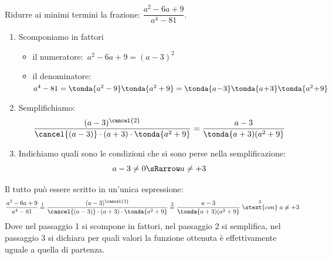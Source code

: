 \begin{esempio}{}{}
Ridurre ai minimi termini la frazione:\quad 
\(\dfrac{a^{2}-6a+9}{a^{4}-81}\).
\begin{enumerate} [left=0mm]
\item Scomponiamo in fattori
\begin{itemize}[left=0mm, nosep]
\item il numeratore:~\(a^2 - 6a +9 = (a - 3 )^2\)
\item il denominatore:
\(a^4 - 81 = \tonda{a^2 - 9} \tonda{a^2 + 9} = 
             \tonda{a\!-\!3}\tonda{a\!+\!3} \tonda{a^2\!+\!9} \)
\end{itemize}
\item Semplifichiamo:
\[\dfrac{(a-3)^{\cancel{2}}}
        {\cancel{(a-3)}\cdot (a+3)\cdot  \tonda{a^{2}+9} }=
  \dfrac{a-3}{\tonda{a+3)(a^{2}+9}}\]
\item Indichiamo quali sono le condizioni che si sono perse nella 
semplificazione:
\[a-3 \neq 0 \sRarrow a \neq +3\]
\end{enumerate}
Il tutto può essere scritto in un'unica espressione:
\[\dfrac{a^{2}-6a+9}{a^{4}-81} \stackrel{1}{=} 
  \dfrac{(a-3)^{\cancel{2}}}
        {\cancel{(a-3)}\cdot (a+3)\cdot \tonda{a^{2}+9}}\stackrel{2}{=} 
  \dfrac{a-3}{ \tonda{a+3)(a^{2}+9}} \stackrel{3}{\stext{con}} 
  a \neq +3\]
Dove nel passaggio 1 si scompone in fattori, nel passaggio 2 si 
semplifica, nel passaggio 3 si dichiara per quali valori la funzione 
ottenuta è effettivamente uguale a quella di partenza.
\end{esempio}

